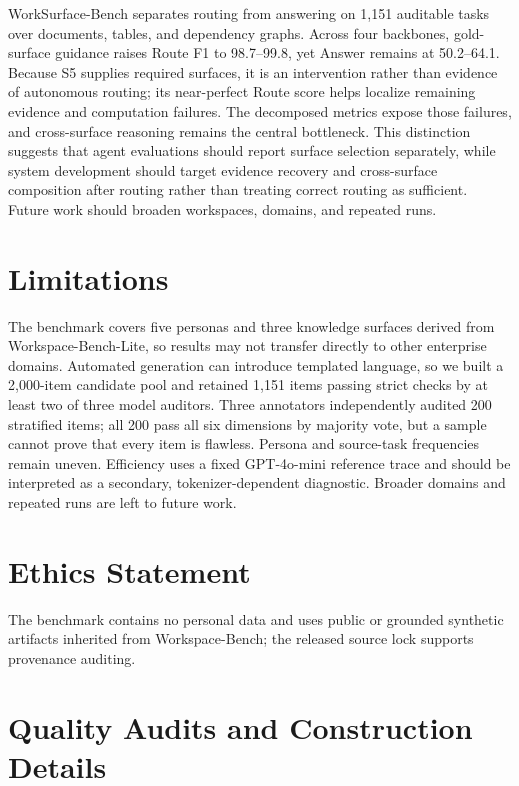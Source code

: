 \documentclass[11pt]{article}
\begin{document}
WorkSurface-Bench separates routing from answering on 1{,}151 auditable tasks
over documents, tables, and dependency graphs. Across four backbones,
gold-surface guidance raises Route F1 to 98.7--99.8, yet Answer remains at
50.2--64.1. Because S5 supplies required surfaces, it is an intervention
rather than evidence of autonomous routing; its near-perfect Route score helps
localize remaining evidence and computation failures. The decomposed
metrics expose those failures, and cross-surface reasoning remains the central
bottleneck. This distinction suggests that agent evaluations should report
surface selection separately, while system development should target evidence
recovery and cross-surface composition after routing rather than treating
correct routing as sufficient. Future work should broaden workspaces, domains,
and repeated runs.

\clearpage
\section*{Limitations}
The benchmark covers five personas and three knowledge surfaces derived from
Workspace-Bench-Lite, so results may not transfer directly to other enterprise
domains. Automated generation can introduce templated language, so we built a
2{,}000-item candidate pool and retained 1{,}151 items passing strict checks by
at least two of three model auditors. Three annotators independently audited
200 stratified items; all 200 pass all six dimensions by majority vote, but a
sample cannot prove that every item is flawless. Persona and
source-task frequencies remain uneven. Efficiency uses a fixed GPT-4o-mini
reference trace and should be interpreted as a secondary, tokenizer-dependent
diagnostic. Broader domains and repeated runs are left to future work.

\section*{Ethics Statement}
The benchmark contains no personal data and uses public or grounded synthetic
artifacts inherited from Workspace-Bench; the released source lock supports
provenance auditing.



\appendix
\section{Quality Audits and Construction Details}
\label{sec:appendix}
\end{document}
